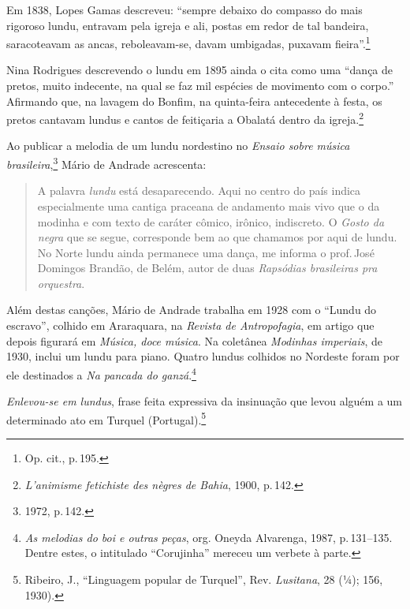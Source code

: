 Em 1838, Lopes Gamas descreveu: ``sempre debaixo do compasso do mais
rigoroso lundu, entravam pela igreja e ali, postas em redor de tal
bandeira, saracoteavam as ancas, reboleavam-se, davam umbigadas, puxavam
fieira''.\footnote{Op. cit., p.\,195.}

Nina Rodrigues descrevendo o lundu em 1895 ainda o cita como uma ``dança
de pretos, muito indecente, na qual se faz mil espécies de movimento com
o corpo.'' Afirmando que, na lavagem do Bonfim, na quinta-feira
antecedente à festa, os pretos cantavam lundus e cantos de feitiçaria a
Obalatá dentro da igreja.\footnote{\textit{L'animisme fetichiste des nègres de
Bahia}, 1900, p.\,142.} %

Ao publicar a melodia de um lundu nordestino no \textit{Ensaio sobre
música brasileira},\footnote{1972, p.\,142.} Mário de Andrade acrescenta: 

\begin{quote}
\small{A palavra \textit{lundu} está desaparecendo. Aqui no centro do país indica
especialmente uma cantiga praceana de andamento mais vivo que o da
modinha e com texto de caráter cômico, irônico, indiscreto. O
\textit{Gosto da negra} que se segue, corresponde bem ao que chamamos por
aqui de lundu. No Norte lundu ainda permanece uma dança, me informa o
prof.\,José Domingos Brandão, de Belém, autor de duas \textit{Rapsódias
brasileiras pra orquestra}.}
\end{quote}



Além destas canções, Mário de Andrade
trabalha em 1928 com o ``Lundu do escravo'', colhido em
Araraquara, na \textit{Revista de Antropofagia}, em artigo que depois
figurará em \textit{Música, doce música}. Na coletânea \textit{Modinhas
imperiais}, de 1930, inclui um lundu para piano. Quatro lundus colhidos
no Nordeste foram por ele destinados a \textit{Na pancada do ganzá}.\footnote{\textit{As melodias do boi e outras peças}, org. Oneyda Alvarenga, 1987,
p.\,131--135. Dentre estes, o intitulado ``Corujinha'' mereceu um
verbete à parte.} %

\textit{Enlevou-se em lundus}, frase feita expressiva da insinuação que levou
alguém a um determinado ato em Turquel (Portugal).\footnote{Ribeiro, J.,
``Linguagem popular de Turquel'', Rev. \textit{Lusitana}, 28 (¼); 156, 1930).}

